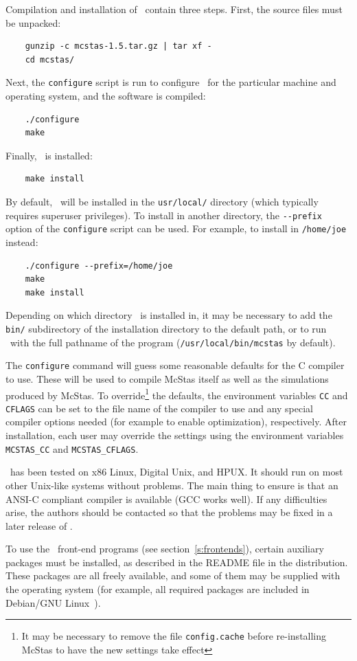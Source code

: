 Compilation and installation of \MCS\ contain three
steps. First, the source files must be unpacked:
\begin{verbatim}
    gunzip -c mcstas-1.5.tar.gz | tar xf -
    cd mcstas/
\end{verbatim}
Next, the \verb+configure+ script is run to configure \MCS\ for the
particular machine and operating system, and the software is
compiled:
\begin{verbatim}
    ./configure
    make
\end{verbatim}
Finally, \MCS\ is installed:
\begin{verbatim}
    make install
\end{verbatim}
By default, \MCS\ will be installed in the \verb+usr/local/+ directory
(which typically requires superuser privileges). To install in another
directory, the \verb+--prefix+ option of the \verb+configure+ script can
be used. For example, to install in \verb+/home/joe+ instead:
\begin{verbatim}
    ./configure --prefix=/home/joe
    make
    make install
\end{verbatim}
Depending on which directory \MCS\ is installed in, it may be necessary
to add the \verb+bin/+ subdirectory of the installation directory to the
default path, or to run \MCS\ with the full pathname of the program
(\verb+/usr/local/bin/mcstas+ by default).

The \verb+configure+ command will guess some reasonable defaults for the
C compiler to use. These will be used to compile McStas itself as
well as the simulations produced by McStas. To override\footnote{It may
  be necessary to remove the file \texttt{config.cache} before
  re-installing McStas to have the new settings take effect}
the defaults, the
environment variables \verb+CC+ and \verb+CFLAGS+ can be set to the file
name of the compiler to use and any special compiler options needed (for
example to enable optimization), respectively. After installation, each
user may override the settings using the environment variables
\verb+MCSTAS_CC+ and \verb+MCSTAS_CFLAGS+.

\MCS\ has been tested on x86 Linux, Digital Unix, and HPUX. It should
run on most other Unix-like systems without problems. The main thing to
ensure is that an ANSI-C compliant compiler is available (GCC works
well). If any difficulties arise, the authors should be contacted
so that the problems may be fixed in a later release of \MCS.

To use the \MCS\ front-end programs (see section~\ref{s:frontends}),
certain auxiliary packages must be installed, as described in the README
file in the distribution. These packages are all freely available, and
some of
them may be supplied with the operating system (for example,
all required packages are included in Debian/GNU Linux~\cite{debian_webpage}).

